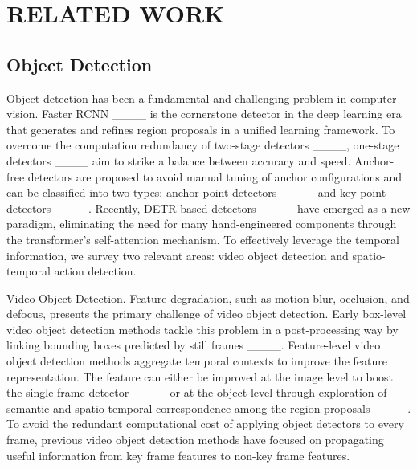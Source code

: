 \section{RELATED WORK}
\subsection{Object Detection }
Object detection has been a fundamental and challenging
problem in computer vision. Faster RCNN ____ is the cornerstone detector in the deep learning era that generates and refines region proposals in a unified learning framework. To overcome the computation redundancy of two-stage detectors ____, one-stage detectors ____ aim to strike a balance between accuracy and speed. Anchor-free detectors are proposed to avoid manual tuning of anchor configurations and can be classified into two types: anchor-point detectors ____ and key-point detectors ____. Recently, DETR-based detectors ____ have emerged as a new paradigm,  eliminating the need for many hand-engineered components through the transformer's self-attention mechanism. To effectively leverage the temporal information, we survey two relevant areas: video object detection and spatio-temporal action detection.

Video Object Detection. Feature degradation, such as motion blur, occlusion, and defocus, presents the primary challenge of video object detection. Early box-level video object detection methods tackle this problem in a post-processing way by linking bounding boxes predicted by still frames ____. Feature-level video object detection methods aggregate temporal contexts to improve the feature representation. The feature can either be improved at the image level to boost the single-frame detector ____ or at the object level through exploration of semantic and spatio-temporal correspondence among the region proposals ____.  To avoid the redundant computational cost of applying object detectors to every frame, previous video object detection methods have focused on propagating useful information from key frame features to non-key frame features. 


